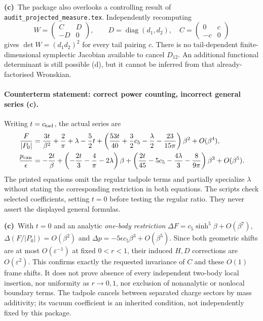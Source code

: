 \documentclass[11pt,a4paper]{article}
\newcommand{\Lc}{\textbf{(c)}\ }
\newcommand{\file}[1]{\nolinkurl{#1}}
\begin{document}
\Lc The package also overlooks a controlling result of
\file{audit_projected_measure.tex}. Independently recomputing
\[
 W=\begin{pmatrix}C&D\\-D&0\end{pmatrix},\qquad
 D=\operatorname{diag}(d_1,d_2),\quad C=\begin{pmatrix}0&c\\-c&0\end{pmatrix}
\]
gives $\det W=(d_1d_2)^2$ for every tail pairing $c$.
There is no tail-dependent finite-dimensional symplectic Jacobian available
to cancel $D_{12}$. An additional functional determinant is still possible
(d), but it cannot be inferred from that already-factorised Wronskian.

\paragraph{Counterterm statement: correct power counting, incorrect general series (c).}
Writing $t=c_{\rm tad}$, the actual series are
\begin{align}
 \frac{F}{|P_0|}
 &=\frac{3t}{\beta^2}+\frac2\pi+\lambda-\frac52t
 +\left(\frac{53t}{40}+\frac32c_5-\frac\lambda2-
 \frac{23}{15\pi}\right)\beta^2+O(\beta^4),\\
 \frac{p_{\rm can}}\epsilon
 &=-\frac{2t}{\beta}
 +\left(-\frac{2t}{3}-\frac4\pi-2\lambda\right)\beta
 +\left(\frac{2t}{45}-5c_5-\frac{4\lambda}{3}-\frac8{9\pi}\right)
 \beta^3+O(\beta^5).
 \label{eq:tadpole}
\end{align}
The printed equations omit the regular tadpole terms and partially specialize
$\lambda$ without stating the corresponding restriction in both equations.
The scripts check selected coefficients, setting $t=0$ before testing the
regular ratio. They never assert the displayed general formulas.

\Lc With $t=0$ and an analytic \emph{one-body restriction}
$\Delta F=c_5\sinh^5\beta+O(\beta^7)$,
$\Delta(F/|P_0|)=O(\beta^2)$ and
$\Delta p=-5\epsilon c_5\beta^3+O(\beta^5)$.
Since both geometric shifts are at most $O(\varepsilon^{-1})$ at fixed
$0<r<1$, their induced $H,D$ corrections are $O(\varepsilon^2)$.
This confirms exactly the requested invariance of $C$ and these $O(1)$
frame shifts. It does not prove absence of every independent two-body local
insertion, nor uniformity as $r\to0,1$, nor exclusion of nonanalytic or
nonlocal boundary terms. The tadpole cancels between separated charge sectors
by mass additivity; its vacuum coefficient is an inherited condition, not
independently fixed by this package.
\end{document}
